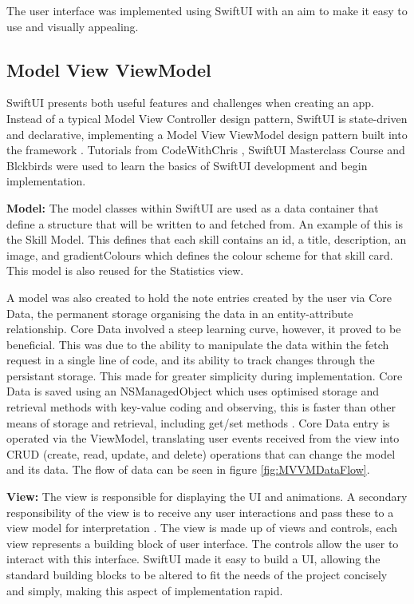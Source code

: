 \documentclass{l4proj}
\begin{document}
The user interface was implemented using SwiftUI with an aim to make it easy to use and visually appealing. 

\subsection{Model View ViewModel}

SwiftUI presents both useful features and challenges when creating an app. Instead of a typical Model View Controller design pattern, SwiftUI is state-driven and declarative, implementing a Model View ViewModel design pattern built into the framework \citep{naumov_swiftui_architecture_2019}. Tutorials from CodeWithChris \citep{ching_codewithchris_2021}, SwiftUI Masterclass Course \citep{petras_swiftui_2021} and Blckbirds \citep{blckbirds_learn_2021} were used to learn the basics of SwiftUI development and begin implementation.

\textbf{Model:} The model classes within SwiftUI are used as a data container that define a structure that will be written to and fetched from. An example of this is the Skill Model. This defines that each skill contains an id, a title, description, an image, and gradientColours which defines the colour scheme for that skill card. This model is also reused for the Statistics view.

A model was also created to hold the note entries created by the user via Core Data, the permanent storage organising the data in an entity-attribute relationship. Core Data involved a steep learning curve, however, it proved to be beneficial. This was due to the ability to manipulate the data within the fetch request in a single line of code, and its ability to track changes through the persistant storage. This made for greater simplicity during implementation. Core Data is saved using an NSManagedObject which uses optimised storage and retrieval methods with key-value coding and observing, this is faster than other means of storage and retrieval, including get/set methods \citep{apple_developer_documentation_core_2021}. Core Data entry is operated via the ViewModel, translating user events received from the view into CRUD (create, read, update, and delete) operations that can change the model and its data. The flow of data can be seen in figure \ref{fig:MVVMDataFlow}. 

\textbf{View:} The view is responsible for displaying the UI and animations. A secondary responsibility of the view is to receive any user interactions and pass these to a view model for interpretation \citep{bulavin_modern_2020}. The view is made up of views and controls, each view represents a building block of user interface. The controls allow the user to interact with this interface. SwiftUI made it easy to build a UI, allowing the standard building blocks to be altered to fit the needs of the project concisely and simply, making this aspect of implementation rapid.
\end{document}
